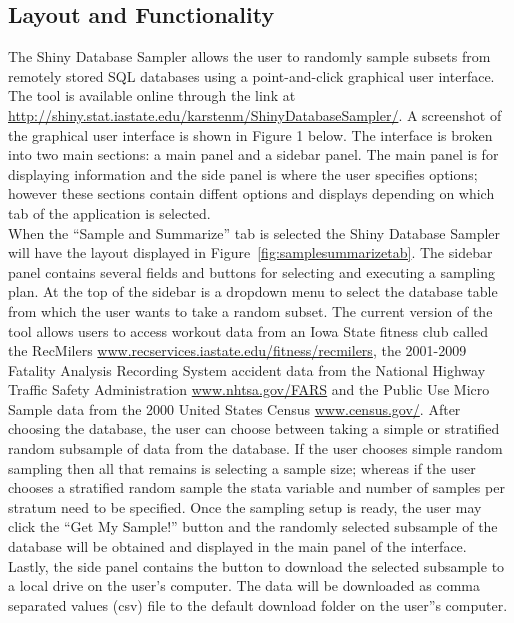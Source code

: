 \documentclass{article}\usepackage[]{graphicx}\usepackage[]{color}
\newcommand{\km}[1]{{\color{Orange} #1}}
\begin{document}
\subsection{Layout and Functionality}

The Shiny Database Sampler allows the user to randomly sample subsets from remotely stored SQL databases using a point-and-click graphical user interface. The tool is available online through the link at \url{http://shiny.stat.iastate.edu/karstenm/ShinyDatabaseSampler/}.  A screenshot of the graphical user interface is shown in Figure 1 below.  The interface is broken into two main sections: a main panel and a sidebar panel. The main panel is for displaying information and the side panel is where the user specifies options; however these sections contain diffent options and displays depending on which tab of the application is selected.\\  

\km{  When the ``Sample and Summarize'' tab is selected the Shiny Database Sampler will have the layout displayed in Figure~\ref{fig:samplesummarizetab}. The sidebar panel contains several fields and buttons for selecting and executing a sampling plan.  At the top of the sidebar is a dropdown menu to select the database table from which the user wants to take a random subset.  The current version of the tool allows users to access workout data from an Iowa State fitness club called the RecMilers \url{www.recservices.iastate.edu/fitness/recmilers}, the 2001-2009 Fatality Analysis Recording System accident data from the National Highway Traffic Safety Administration \url{www.nhtsa.gov/FARS} and the Public Use Micro Sample data from the 2000 United States Census \url{www.census.gov/}.  After choosing the database, the user can choose between taking a simple or stratified random subsample of data from the database.  If the user chooses simple random sampling then all that remains is selecting a sample size; whereas if the user chooses a stratified random sample the stata variable and number of samples per stratum need to be specified.  Once the sampling setup is ready, the user may click the ``Get My Sample!'' button and the randomly selected subsample of the database will be obtained and displayed in the main panel of the interface.  Lastly, the side panel contains the button to download the selected subsample to a local drive on the user's computer.  The data will be downloaded as comma separated values (csv) file to the default download folder on the user''s computer.\\  }
\end{document}

